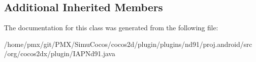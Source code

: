 \subsection*{Additional Inherited Members}


The documentation for this class was generated from the following file\+:\begin{DoxyCompactItemize}
\item 
/home/pmx/git/\+P\+M\+X/\+Simu\+Cocos/cocos2d/plugin/plugins/nd91/proj.\+android/src/org/cocos2dx/plugin/I\+A\+P\+Nd91.\+java\end{DoxyCompactItemize}
